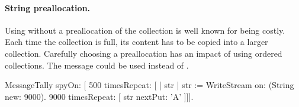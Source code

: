 \documentclass[a4paper,10pt,twoside]{book}
\begin{document}
%
%
%
%
%
%
%
%
%


\paragraph{String preallocation.} Using  without a preallocation of the collection is well known for being costly. Each time the collection is full, its content has to be copied into a larger collection. Carefully choosing a preallocation has an impact of using ordered collections. The message  could be used instead of .

\begin{code}{}
MessageTally spyOn: 
    [ 500 timesRepeat: [
                    | str |  
                    str := WriteStream on: (String new: 9000). 
                    9000 timesRepeat: [ str nextPut: 'A' ]]].
\end{code}
\end{document}

